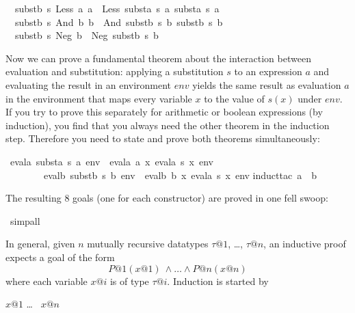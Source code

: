 \begin{isabellebody}
\isanewline
\ \ {\isachardoublequote}substb\ s\ {\isacharparenleft}Less\ a\ a\ {\isacharequal}\ Less\ {\isacharparenleft}substa\ s\ a\ {\isacharparenleft}substa\ s\ a\isanewline
\ \ {\isachardoublequote}substb\ s\ {\isacharparenleft}And\ b\ b\ {\isacharequal}\ And\ {\isacharparenleft}substb\ s\ b\ {\isacharparenleft}substb\ s\ b\isanewline
\ \ {\isachardoublequote}substb\ s\ {\isacharparenleft}Neg\ b{\isacharparenright}\ {\isacharequal}\ Neg\ {\isacharparenleft}substb\ s\ b{\isacharparenright}{\isachardoublequote}%
\begin{isamarkuptext}%
Now we can prove a fundamental theorem about the interaction between
evaluation and substitution: applying a substitution $s$ to an expression $a$
and evaluating the result in an environment $env$ yields the same result as
evaluation $a$ in the environment that maps every variable $x$ to the value
of $s(x)$ under $env$. If you try to prove this separately for arithmetic or
boolean expressions (by induction), you find that you always need the other
theorem in the induction step. Therefore you need to state and prove both
theorems simultaneously:%
\end{isamarkuptext}%
\ {\isachardoublequote}evala\ {\isacharparenleft}substa\ s\ a{\isacharparenright}\ env\ {\isacharequal}\ evala\ a\ {\isacharparenleft}{\isasymlambda}x{\isachardot}\ evala\ {\isacharparenleft}s\ x{\isacharparenright}\ env{\isacharparenright}\ {\isasymand}\isanewline
\ \ \ \ \ \ \ \ evalb\ {\isacharparenleft}substb\ s\ b{\isacharparenright}\ env\ {\isacharequal}\ evalb\ b\ {\isacharparenleft}{\isasymlambda}x{\isachardot}\ evala\ {\isacharparenleft}s\ x{\isacharparenright}\ env{\isacharparenright}{\isachardoublequote}\isanewline
{}induct{\isacharunderscore}tac\ a\ \ b{\isacharparenright}%
\begin{isamarkuptxt}%
\noindent
The resulting 8 goals (one for each constructor) are proved in one fell swoop:%
\end{isamarkuptxt}%
\ simp{\isacharunderscore}all%
\begin{isamarkuptext}%
In general, given $n$ mutually recursive datatypes $\tau@1$, \dots, $\tau@n$,
an inductive proof expects a goal of the form
\[ P@1(x@1)\ \land \dots \land P@n(x@n) \]
where each variable $x@i$ is of type $\tau@i$. Induction is started by
\begin{isabelle}
 $x@1$  \dots\  $x@n$\isa{{\isacharparenright}}
\end{isabelle}


\end{isamarkuptext}
\end{isabellebody}
